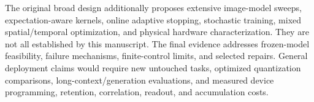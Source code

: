 \documentclass[11pt]{article}
\begin{document}
The original broad design additionally proposes extensive image-model sweeps, expectation-aware kernels, online adaptive stopping, stochastic training, mixed spatial/temporal optimization, and physical hardware characterization. They are not all established by this manuscript. The final evidence addresses frozen-model feasibility, failure mechanisms, finite-control limits, and selected repairs. General deployment claims would require new untouched tasks, optimized quantization comparisons, long-context/generation evaluations, and measured device programming, retention, correlation, readout, and accumulation costs.
\end{document}
